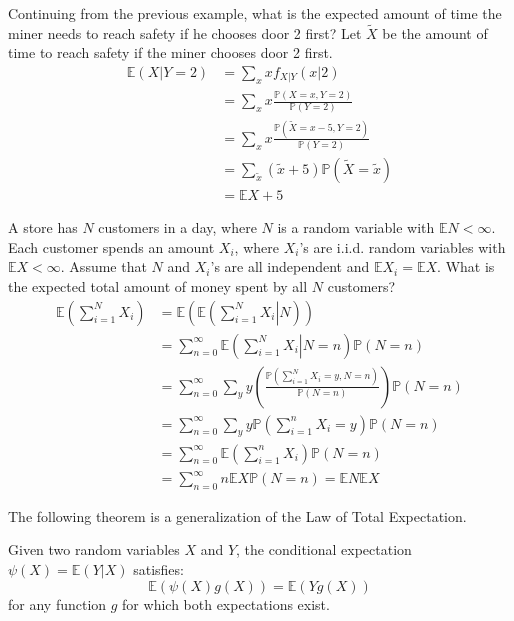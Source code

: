 \documentclass{huhtakm-template-book-v2}
\newcommand{\prob}{\mathbb{P}}
\newcommand{\expect}{\mathbb{E}}
\begin{document}
    \begin{eg}
        Continuing from the previous example, what is the expected amount of time the miner needs to reach safety if he chooses door 2 first? Let $\widetilde{X}$ be the amount of time to reach safety if the miner chooses door 2 first.
        \begin{align*}
            \expect(X|Y = 2) &= \sum_{x}x f_{X|Y}(x|2)\\
            &= \sum_{x}x\frac{\prob(X = x, Y = 2)}{\prob(Y = 2)}\\
            &= \sum_{x}x\frac{\prob(\widetilde{X} = x-5, Y = 2)}{\prob(Y = 2)}\\
            &= \sum_{\widetilde{x}}(\widetilde{x}+5)\prob(\widetilde{X} = \widetilde{x})\\
            &= \expect{X}+5
        \end{align*}
    \end{eg}
    \begin{eg}
        A store has $N$ customers in a day, where $N$ is a random variable with $\expect{N} < \infty$. Each customer spends an amount $X_{i}$, where $X_{i}$'s are i.i.d. random variables with $\expect{X} < \infty$. Assume that $N$ and $X_{i}$'s are all independent and $\expect{X_{i}} = \expect{X}$. What is the expected total amount of money spent by all $N$ customers?
        \begin{align*}
            \expect\left(\sum_{i = 1}^{N}X_{i}\right) &= \expect\left(\expect\left(\left.\sum_{i = 1}^{N}X_{i}\right| N\right)\right)\\
            &= \sum_{n = 0}^{\infty}\expect\left(\left.\sum_{i = 1}^{N}X_{i}\right|N = n\right)\prob(N = n)\\
            &= \sum_{n = 0}^{\infty}\sum_{y}y\left(\frac{\prob\left(\sum_{i = 1}^{N}X_{i} = y, N = n\right)}{\prob(N = n)}\right)\prob(N = n)\\
            &= \sum_{n = 0}^{\infty}\sum_{y}y\prob\left(\sum_{i = 1}^{n}X_{i} = y\right)\prob(N = n)\\
            &= \sum_{n = 0}^{\infty}\expect\left(\sum_{i = 1}^{n}X_{i}\right)\prob(N = n)\\
            &= \sum_{n = 0}^{\infty}n\expect{X}\prob(N = n) = \expect{N}\expect{X}
        \end{align*}
    \end{eg}
    The following theorem is a generalization of the Law of Total Expectation.
    \begin{thm}
        \label{Chapter 6 (Theorem) Generalization of Law of Total Expectation}
        Given two random variables $X$ and $Y$, the conditional expectation $\psi(X) = \expect(Y|X)$ satisfies:
        \begin{equation*}
            \expect(\psi(X)g(X)) = \expect(Yg(X))
        \end{equation*}
        for any function $g$ for which both expectations exist.
    \end{thm}
\end{document}
